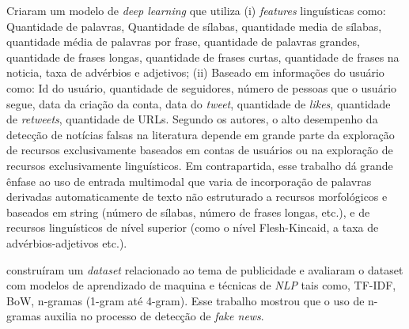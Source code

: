 \citet{Mouratidis20211} Criaram um modelo de \textit{deep learning} que utiliza (i) \textit{features} linguísticas como: Quantidade de palavras, Quantidade de sílabas, quantidade media de sílabas, quantidade média de palavras por frase, quantidade de palavras grandes, quantidade de frases longas, quantidade de frases curtas, quantidade de frases na noticia, taxa de advérbios e adjetivos; (ii) Baseado em informações do usuário como: Id do usuário, quantidade de seguidores, número de pessoas que o usuário segue, data da criação da conta, data do \textit{tweet}, quantidade de \textit{likes}, quantidade de \textit{retweets}, quantidade de URLs. Segundo os autores, o alto desempenho da detecção de notícias falsas na literatura depende em grande parte da exploração de recursos exclusivamente baseados em contas de usuários ou na exploração de recursos exclusivamente linguísticos. Em contrapartida, esse trabalho dá grande ênfase ao uso de entrada multimodal que varia de incorporação de palavras derivadas automaticamente de texto não estruturado a recursos morfológicos e baseados em string (número de sílabas, número de frases longas, etc.), e de recursos linguísticos de nível superior (como o nível Flesh-Kincaid, a taxa de advérbios-adjetivos etc.).

\citet{Setiawan2021} construíram um \textit{dataset} relacionado ao tema de publicidade e avaliaram o dataset com modelos de aprendizado de maquina e técnicas de \textit{NLP} tais como, TF-IDF, BoW, n-gramas (1-gram até 4-gram). 
Esse trabalho mostrou que o uso de n-gramas auxilia no processo de detecção de \textit{fake news}.


